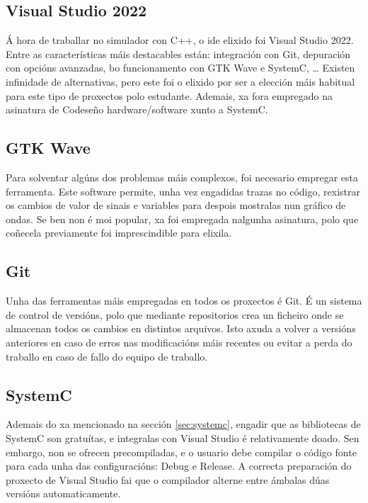 \subsection{Visual Studio 2022}\label{sec:visual_studio}
Á hora de traballar no simulador con C++, o \acrshort{ide} elixido foi Visual Studio 2022. Entre as características máis destacables están: integración con Git, depuración con opcións avanzadas, bo funcionamento con GTK Wave e SystemC, \dots{}  Existen infinidade de alternativas, pero este foi o elixido por ser a elección máis habitual para este tipo de proxectos polo estudante. Ademais, xa fora empregado na asinatura de Codeseño \gls{hardware}/\gls{software} xunto a SystemC. 

\subsection{GTK Wave}\label{sec:gtkwave}
Para solventar algúns dos problemas máis complexos, foi necesario empregar esta ferramenta. Este software permite, unha vez engadidas trazas no código, rexistrar os cambios de valor de sinais e variables para despois mostralas nun gráfico de ondas. Se ben non é moi popular, xa foi empregada nalgunha asinatura, polo que  coñecela previamente foi imprescindible para elixila.

\subsection{Git}\label{sec:git}
Unha das ferramentas máis empregadas en todos os proxectos é Git. É un sistema de control de versións, polo que mediante repositorios crea un ficheiro onde se almacenan todos os cambios en distintos arquivos. Isto axuda a volver a versións anteriores en caso de erros nas modificacións máis recentes ou evitar a perda do traballo en caso de fallo do equipo de traballo.


\subsection{SystemC}\label{sec:imp_systemC}
Ademais do xa mencionado na sección \ref{sec:systemc}, engadir que as bibliotecas de SystemC son gratuítas, e integralas con Visual Studio é relativamente doado. Sen embargo, non se ofrecen precompiladas, e o usuario debe compilar o código fonte para cada unha das configuracións: Debug e Release. A correcta preparación do proxecto de Visual Studio fai que o compilador alterne entre ámbalas dúas versións automaticamente.




